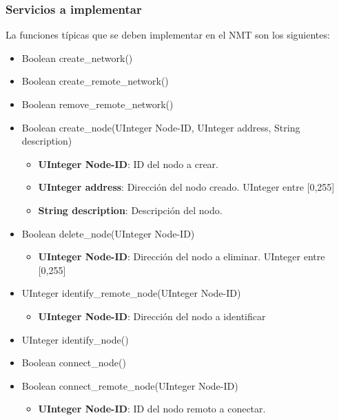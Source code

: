 \subsubsection{Servicios a implementar}\label{subsubsection_servicios_implementar}
La funciones típicas que se deben implementar en el NMT son los siguientes:
\begin{itemize}
\item Boolean create\_network()
\item Boolean create\_remote\_network() 
\item Boolean remove\_remote\_network()
\item Boolean create\_node(UInteger Node-ID, UInteger address, String description)
  \begin{itemize}
  \item \textbf{UInteger Node-ID}: ID del nodo a crear.
  \item \textbf{UInteger address}: Dirección del nodo creado. UInteger entre [0,255]
  \item \textbf{String description}: Descripción del nodo.
  \end{itemize}
\item Boolean delete\_node(UInteger Node-ID)
  \begin{itemize}
   \item \textbf{UInteger Node-ID}: Dirección del nodo a eliminar. UInteger entre [0,255]
  \end{itemize}
    
\item UInteger identify\_remote\_node(UInteger Node-ID)
  \begin{itemize}
  \item \textbf{UInteger Node-ID}: Dirección del nodo a identificar
  \end{itemize}

\item UInteger identify\_node()
  
\item Boolean connect\_node()
  
\item Boolean connect\_remote\_node(UInteger Node-ID)
  \begin{itemize}
    \item \textbf{UInteger Node-ID}: ID del nodo remoto a conectar.
  \end{itemize}


\end{itemize}
